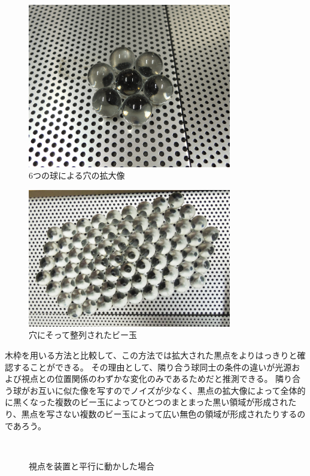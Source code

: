 \begin{figure}[htbp]
  \centering
  \includegraphics[width=3.5in]{./img/exp_narabe_six.jpg}
  \caption{6つの球による穴の拡大像}
  \label{FExpNarabeSix}
\end{figure}

\begin{figure}[htbp]
  \centering
  \includegraphics[width=3.5in]{./img/exp_narabe_all.jpg}
  \caption{穴にそって整列されたビー玉}
  \label{FExpNarabeAll}
\end{figure}

木枠を用いる方法と比較して、この方法では拡大された黒点をよりはっきりと確認することができる。
その理由として、隣り合う球同士の条件の違いが光源および視点との位置関係のわずかな変化のみであるためだと推測できる。
隣り合う球がお互いに似た像を写すのでノイズが少なく、黒点の拡大像によって全体的に黒くなった複数のビー玉によってひとつのまとまった黒い領域が形成されたり、黒点を写さない複数のビー玉によって広い無色の領域が形成されたりするのであろう。

\begin{figure}[htbp]
  \centering
{}
\\
  \caption{視点を装置と平行に動かした場合}
  \label{FExpMove}
\end{figure}

